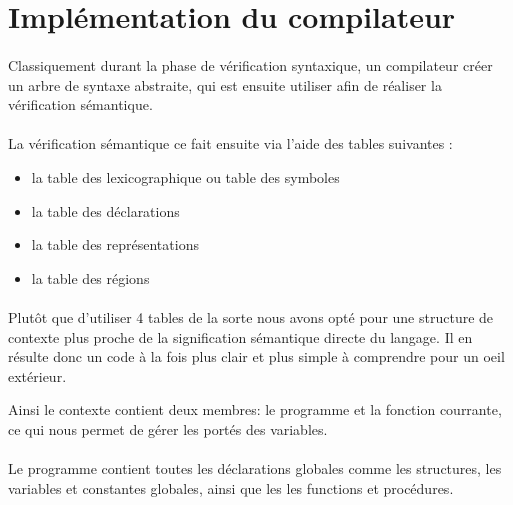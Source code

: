 \section{Implémentation du compilateur}

\paragraph{}Classiquement durant la phase de vérification syntaxique, un compilateur créer un
arbre de syntaxe abstraite, qui est ensuite utiliser afin de réaliser la vérification sémantique.



\paragraph{}La vérification sémantique ce fait ensuite via l'aide des tables suivantes :

\begin{itemize}
 \item la table des lexicographique ou table des symboles
 \item la table des déclarations
 \item la table des représentations
 \item la table des régions
\end{itemize}

\paragraph{}Plutôt que d'utiliser 4 tables de la sorte nous avons opté pour une structure de contexte
plus proche de la signification sémantique directe du langage.
Il en résulte donc un code à la fois plus clair et plus simple à comprendre pour un oeil extérieur.

Ainsi le contexte contient deux membres: le programme et la fonction courrante, ce qui nous permet de 
gérer les portés des variables.

\paragraph{}Le programme contient toutes les déclarations globales comme les structures, les variables
et constantes globales, ainsi que les les functions et procédures.

